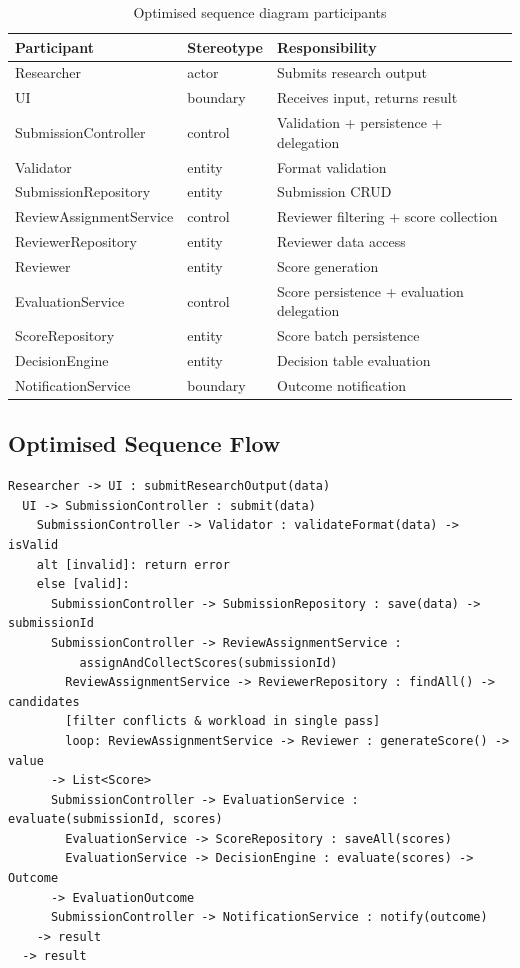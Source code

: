 \documentclass[12pt, a4paper]{article}
\begin{document}
\begin{table}[H]
\centering
\caption{Optimised sequence diagram participants}
\label{tab:opt-participants}
\begin{tabularx}{\textwidth}{l l X}
    \toprule
    \textbf{Participant} & \textbf{Stereotype} & \textbf{Responsibility} \\
    \midrule
    Researcher & actor & Submits research output \\
    UI & boundary & Receives input, returns result \\
    SubmissionController & control & Validation + persistence + delegation \\
    Validator & entity & Format validation \\
    SubmissionRepository & entity & Submission CRUD \\
    ReviewAssignmentService & control & Reviewer filtering + score collection \\
    ReviewerRepository & entity & Reviewer data access \\
    Reviewer & entity & Score generation \\
    EvaluationService & control & Score persistence + evaluation delegation \\
    ScoreRepository & entity & Score batch persistence \\
    DecisionEngine & entity & Decision table evaluation \\
    NotificationService & boundary & Outcome notification \\
    \bottomrule
\end{tabularx}
\end{table}

\subsection{Optimised Sequence Flow}

\begin{lstlisting}[style=outputstyle]
Researcher -> UI : submitResearchOutput(data)
  UI -> SubmissionController : submit(data)
    SubmissionController -> Validator : validateFormat(data) -> isValid
    alt [invalid]: return error
    else [valid]:
      SubmissionController -> SubmissionRepository : save(data) -> submissionId
      SubmissionController -> ReviewAssignmentService :
          assignAndCollectScores(submissionId)
        ReviewAssignmentService -> ReviewerRepository : findAll() -> candidates
        [filter conflicts & workload in single pass]
        loop: ReviewAssignmentService -> Reviewer : generateScore() -> value
      -> List<Score>
      SubmissionController -> EvaluationService : evaluate(submissionId, scores)
        EvaluationService -> ScoreRepository : saveAll(scores)
        EvaluationService -> DecisionEngine : evaluate(scores) -> Outcome
      -> EvaluationOutcome
      SubmissionController -> NotificationService : notify(outcome)
    -> result
  -> result
\end{lstlisting}
\end{document}
